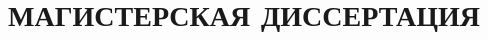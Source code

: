 \documentclass[candidate,subf,href,colorlinks=true
]{disser}
\begin{document}



\title{МАГИСТЕРСКАЯ ДИССЕРТАЦИЯ\\}

\maketitle

%
%
%
%
%
%
%
%
%
%

\tableofcontents


%








% 

\appendix

\end{document}

